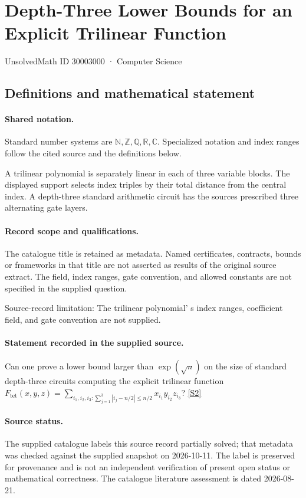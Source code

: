 \documentclass[11pt]{article}
\newcommand{\sref}[2]{\hyperlink{source:#1:#2}{[S#2]}}
\begin{document}
\setcounter{section}{30002999}
\section{Depth-Three Lower Bounds for an Explicit Trilinear Function}\label{30003000}
{\small\sffamily UnsolvedMath ID 30003000 · Computer Science}
\subsection{Definitions and mathematical statement}

\paragraph{Shared notation.}Standard number systems are $\mathbb N,\mathbb Z,\mathbb Q,\mathbb R,\mathbb C$. Specialized notation and index ranges follow the cited source and the definitions below.


A trilinear polynomial is separately linear in each of three variable blocks. The displayed support selects index triples by their total distance from the central index. A depth-three standard arithmetic circuit has the source\textquotesingle s prescribed three alternating gate layers.
\paragraph{Record scope and qualifications.}
The catalogue title is retained as metadata. Named certificates, contracts, bounds or frameworks in that title are not asserted as results of the original source extract.
The field, index ranges, gate convention, and allowed constants are not specified in the supplied question.

Source-record limitation: The trilinear polynomial' s index ranges, coefficient field, and gate convention are not supplied.
\paragraph{Statement recorded in the supplied source.}
Can one prove a lower bound larger than $\exp(\sqrt n)$ on the size of standard depth-three circuits computing the explicit trilinear function $F_{\mathrm{tet}}(x,y,z)=\sum_{i_1,i_2,i_3:\sum_{j=1}^3|i_j-n/2|\leq n/2}x_{i_1}y_{i_2}z_{i_3}$? \sref{30003000}{2}
\paragraph{Source status.}
The supplied catalogue labels this source record partially solved; that metadata was checked against the supplied snapshot on 2026-10-11. The label is preserved for provenance and is not an independent verification of present open status or mathematical correctness. The catalogue literature assessment is dated 2026-08-21.
\end{document}
